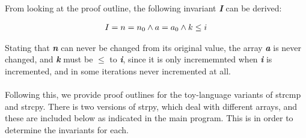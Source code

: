 \documentclass [a4paper, 12pt, fleqn]  {article}
\begin{document}
From looking at the proof outline, the following invariant \textit{\textbf{I}}  can be derived:

\begin{gather*}
I = {n = n_0 \wedge a = a_0 \wedge k \leq i} \\
\end{gather*}

Stating that \textit{\textbf{n}} can never be changed from its original value, the array \textit{\textbf{a}} is never changed, and \textit{\textbf{k}} must be $\leq$ to \textit{\textbf{i}}, since it is only incrememnted when \textit{\textbf{i}} is incremented, and in some iterations never incremented at all. 
\\~\\
Following this, we provide proof outlines for the toy-language variants of strcmp and strcpy. There is two versions of strpy, which deal with different arrays, and these are included below as indicated in the main program. This is in order to determine the invariants for each.
\end{document}
